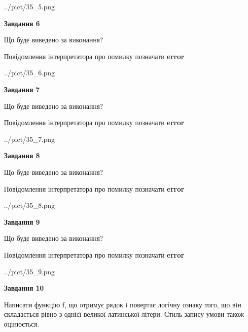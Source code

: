 \documentclass[12pt, ukrainian]{article}
\begin{document}
{\begin {large}
\begin{center}
	{../pict/35_5.png}
\end{center}
\newpage

{\begin {center}\textbf{Завдання 6}\end {center}}\par
Що буде виведено за виконання? \par
Повідомлення інтерпретатора про помилку позначати \textbf{error}

\begin{center}
	{../pict/35_6.png}
\end{center}
\newpage

{\begin {center}\textbf{Завдання 7}\end {center}}\par
Що буде виведено за виконання? \par
Повідомлення інтерпретатора про помилку позначати \textbf{error}

\begin{center}
	{../pict/35_7.png}
\end{center}
\newpage

{\begin {center}\textbf{Завдання 8}\end {center}}\par
Що буде виведено за виконання? \par
Повідомлення інтерпретатора про помилку позначати \textbf{error}

\begin{center}
	{../pict/35_8.png}
\end{center}
\newpage

{\begin {center}\textbf{Завдання 9}\end {center}}\par
Що буде виведено за виконання? \par
Повідомлення інтерпретатора про помилку позначати \textbf{error}

\begin{center}
	{../pict/35_9.png}
\end{center}
\newpage

{\begin {center}\textbf{Завдання 10}\end {center}}\par

Написати функцiю f, що отримує рядок i повертає логічну ознаку того, що вiн складається рівно з однієї великої латинської літери. Стиль запису умови також оцінюється.\par
\newpage

\end {large}}
\end{document}
